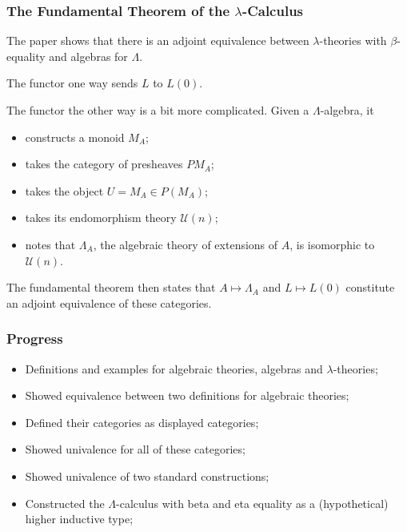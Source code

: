 \documentclass[aspectratio=169]{fancyslides} %
\begin{document}
  \begin{frame}
    \frametitle{The Fundamental Theorem of the $ \lambda $-Calculus}

    The paper shows that there is an adjoint equivalence between $ \lambda $-theories with $ \beta $-equality and algebras for $ \Lambda $.

    \pause

    The functor one way sends $ L $ to $ L(0) $.

    \pause

    The functor the other way is a bit more complicated. Given a $ \Lambda $-algebra, it
    \begin{itemize}
      \item constructs a monoid $ M_A $;
      \item takes the category of presheaves $ P M_A $;
      \item takes the object $ U = M_A \in P(M_A) $;
      \item takes its endomorphism theory $ \mathcal U(n) $;
      \item notes that $ \Lambda_A $, the algebraic theory of extensions of $ A $, is isomorphic to $ \mathcal U(n) $.
    \end{itemize}
    \pause
    The fundamental theorem then states that $ A \mapsto \Lambda_A $ and $ L \mapsto L(0) $ constitute an adjoint equivalence of these categories.
  \end{frame}

  \begin{frame}
    \frametitle{Progress}
    \begin{itemize}
      \item Definitions and examples for algebraic theories, algebras and $ \lambda $-theories; \pause
      \item Showed equivalence between two definitions for algebraic theories; \pause
      \item Defined their categories as displayed categories; \pause
      \item Showed univalence for all of these categories; \pause
      \item Showed univalence of two standard constructions; \pause
      \item Constructed the $ \Lambda $-calculus with beta and eta equality as a (hypothetical) higher inductive type;
    \end{itemize}
  \end{frame}
\end{document}
